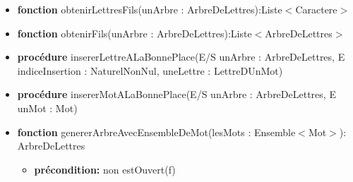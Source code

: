 \documentclass{article}
\begin{document}
	\begin{itemize}[label=$\ $, leftmargin=1cm]
		 \item \textbf{fonction} obtenirLettresFils(unArbre : ArbreDeLettres):Liste$<$Caractere$>$
         \item \textbf{fonction} obtenirFils(unArbre : ArbreDeLettres):Liste$<$ArbreDeLettres$>$
         \item \textbf{procédure} insererLettreALaBonnePlace(E/S unArbre : ArbreDeLettres, E indiceInsertion : NaturelNonNul, uneLettre : LettreDUnMot)
		 \item \textbf{procédure} insererMotALaBonnePlace(E/S unArbre : ArbreDeLettres, E unMot : Mot)
		 
         \item \textbf{fonction} genererArbreAvecEnsembleDeMot(lesMots : Ensemble$<$Mot$>$): ArbreDeLettres
         
        \begin{itemize}[label=$| $]
            \item \textbf{précondition:} non estOuvert(f)
         \end{itemize}
	\end{itemize} 
\end{document}
